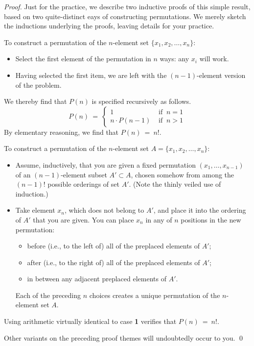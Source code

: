 \begin{proof}
Just for the practice, we describe two inductive proofs of this simple result, based on two
quite-distinct eays of constructing permutations.  We merely
sketch the inductions underlying the proofs, leaving details for your practice.

\medskip

To construct a permutation of the $n$-element set $\{ x_1, x_2, \ldots , x_n\}$:
\begin{itemize}
\item
Select the first element of the permutation in $n$ ways: any $x_i$ will work.
\item
Having selected the first item, we are left with the $(n-1)$-element version of the problem.
\end{itemize}
We thereby find that $P(n)$ is specified recursively as follows.
\[
P(n) \ = \ \left\{
\begin{array}{cl}
1 & \mbox{ if } \ n=1 \\
n \cdot P(n-1) & \mbox{ if } \ n>1
\end{array}
\right.
\]
By elementary reasoning, we find that $P(n) \ = \ n!$.

\bigskip

To construct a permutation of the $n$-element set $A = \{ x_1, x_2, \ldots , x_n\}$:
\begin{itemize}
\item
Assume, inductively, that you are given a fixed 
permutation $(x_1, \ldots , x_{n-1})$ of an $(n-1)$-element subset $A'  \subset A$,
chosen somehow from among the $(n-1)!$ possible orderings of set $A'$.  (Note
the thinly veiled use of induction.)
\item
Take element $x_n$, which does not belong to $A'$, and place it into the ordering of $A'$
that you are given.  You can place $x_n$ in any of $n$ positions in the new permutation:
  \begin{itemize}
  \item
before (i.e., to the left of) all of the preplaced elements of $A'$;
  \item
after (i.e., to the right of) all of the preplaced elements of $A'$;
  \item
in between any adjacent preplaced elements of $A'$.
  \end{itemize}
Each of the preceding $n$ choices creates a unique permutation of the $n$-element set $A$.
\end{itemize}
Using arithmetic virtually identical to case {\bf 1} verifies that $P(n) \ = \ n!$.

\medskip

\noindent
Other variants on the preceding proof themes will undoubtedly occur to you.   \qed
\end{proof}


